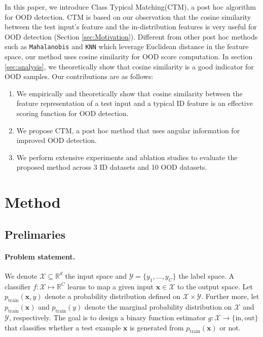 \documentclass[nohyperref]{article}
\theoremstyle{plain}
\theoremstyle{definition}
\theoremstyle{remark}
\newcommand{\Fullname}{Class Typical Matching}
\newcommand{\shortname}{CTM}
\begin{document}
In this paper, we introduce \Fullname\;(\shortname), a post hoc algorithm for OOD detection.
\shortname\; is based on our observation that the cosine similarity between the test input's feature and the in-distribution features is very useful for OOD detection (Section \ref{sec:Motivation}).
Different from other post hoc methods such as \texttt{Mahalanobis} \cite{lee2018mahaood} and \texttt{KNN} \cite{sun2022knn} which leverage Euclidean distance in the feature space, our method uses cosine similarity for OOD score computation.
In section \ref{sec:analysis}, we theoretically show that cosine similarity is a good indicator for OOD samples.
Our contributions are as follows:
\begin{enumerate}
    \item We empirically and theoretically show that cosine similarity between the feature representation of a test input and a typical ID feature is an effective scoring function for OOD detection.
    \item We propose \shortname, a post hoc method that uses angular information for improved OOD detection.
    \item We perform extensive experiments and ablation studies to evaluate the proposed method across 3 ID datasets and 10 OOD datasets.
\end{enumerate}

\section{Method}
\label{sec:method}
\subsection{Prelimaries}
\paragraph{Problem statement.}
We denote $\mathcal{X} \subseteq \mathbb{R}^{d}$ the input space and $\mathcal{Y} = \{y_1, \dots, y_C\}$ the label space. 
A classifier $f: \mathcal{X} \mapsto \mathbb{R}^{C}$ learns to map a given input $\mathbf{x} \in \mathcal{X}$ to the output space.
Let $p_{\text{train}}(\mathbf{x}, y)$ denote a probability distribution defined on $\mathcal{X} \times \mathcal{Y}$.
Further more, let $p_{\text{train}}(\mathbf{x})$ and $p_{\text{train}}(y)$ denote the marginal probability distribution on $\mathcal{X}$ and $\mathcal{Y}$, respectively. 
The goal is to design a binary function estimator $g: \mathcal{X} \to \{\text{in}, \text{out}\}$ that classifies whether a test example $\mathbf{x}$ is generated from $p_{\text{train}}(\mathbf{x})$ or not.
\end{document}
